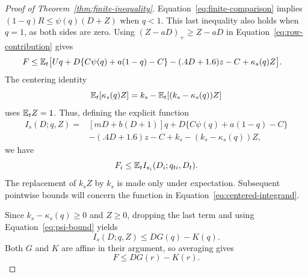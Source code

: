 \begin{proof}[Proof of Theorem~\ref{thm:finite-inequality}]
Equation~\eqref{eq:finite-comparison} implies
$(1-q)R\le\psi(q)(D+Z)$ when $q<1$.  This last inequality also holds
when $q=1$, as both sides are zero.  Using
$(Z-aD)_+\ge Z-aD$ in Equation~\eqref{eq:row-contribution} gives
\begin{align*}
 F\le\mathbb E_t\big[&Uq+D\{C\psi(q)+a(1-q)-C\}
              -(.4D+1.6)z-C+\kappa_s(q)Z\big].
\end{align*}
The centering identity
\[
 \mathbb E_t[\kappa_s(q)Z]
 =k_s-\mathbb E_t[(k_s-\kappa_s(q))Z]
\]
uses $\mathbb E_tZ=1$.  Thus, defining the explicit function
\begin{equation}
\label{eq:centered-integrand}
\begin{aligned}
 I_s(D;q,Z)={}&[mD+b(D+1)]q
 +D\{C\psi(q)+a(1-q)-C\}\\
 &-(.4D+1.6)z-C+k_s-(k_s-\kappa_s(q))Z,
\end{aligned}
\end{equation}
we have
\begin{equation}
\label{eq:centered-row-bound}
 F_i\le\mathbb E_t I_{s_i}(D_i;q_{ti},D_t).
\end{equation}
The replacement of $k_sZ$ by $k_s$ is made only under expectation.
Subsequent pointwise bounds will concern the function in
Equation~\eqref{eq:centered-integrand}.

Since $k_s-\kappa_s(q)\ge0$ and $Z\ge0$, dropping the last term and
using Equation~\eqref{eq:psi-bound} yields
\begin{equation}
\label{eq:pointwise-linear-majorant}
 I_s(D;q,Z)\le DG(q)-K(q).
\end{equation}
Both $G$ and $K$ are affine in their argument, so averaging gives
\begin{equation}
\label{eq:row-linear-majorant}
 F\le DG(r)-K(r).
\end{equation}


\end{proof}
